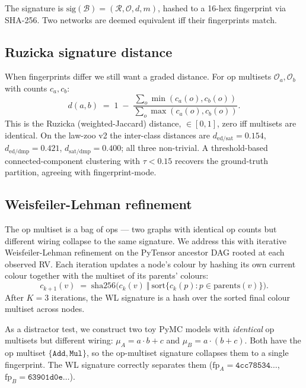 \documentclass{article}
\begin{document}
The signature is
$\mathrm{sig}(\mathcal{B}) = (\mathcal{R}, \mathcal{O}, d, m)$, hashed
to a 16-hex fingerprint via SHA-256. Two networks are deemed
equivalent iff their fingerprints match.

\subsection{Ruzicka signature distance}
\label{sec:ruzicka}

When fingerprints differ we still want a graded distance. For op
multisets $\mathcal{O}_{a}, \mathcal{O}_{b}$ with counts $c_{a}, c_{b}$:
\begin{equation}
d(a, b) \;=\; 1 \;-\; \frac{\sum_{o} \min(c_{a}(o), c_{b}(o))}
                           {\sum_{o} \max(c_{a}(o), c_{b}(o))}.
\end{equation}
This is the Ruzicka (weighted-Jaccard) distance, $\in [0, 1]$, zero iff
multisets are identical. On the law-zoo v2 the inter-class
distances are $d_{\mathrm{ed/sat}} = 0.154$,
$d_{\mathrm{ed/dmp}} = 0.421$, $d_{\mathrm{sat/dmp}} = 0.400$; all
three non-trivial. A threshold-based connected-component clustering
with $\tau < 0.15$ recovers the ground-truth partition, agreeing with
fingerprint-mode.

\subsection{Weisfeiler-Lehman refinement}
\label{sec:wl}

The op multiset is a bag of ops --- two graphs with identical op counts
but different wiring collapse to the same signature. We address this
with iterative Weisfeiler-Lehman refinement
\citep{shervashidze2011wl} on the PyTensor ancestor DAG rooted at
each observed RV. Each iteration updates a node's colour by hashing its
own current colour together with the multiset of its parents' colours:
\begin{equation}
c_{k+1}(v) \;=\; \mathrm{sha256}\bigg(c_{k}(v)\ \big\Vert\ \mathrm{sort}\{c_{k}(p): p \in \mathrm{parents}(v)\}\bigg).
\end{equation}
After $K=3$ iterations, the WL signature is a hash over the sorted
final colour multiset across nodes.

As a distractor test, we construct two toy PyMC models with
\emph{identical} op multisets but different wiring: $\mu_{A} =
a \cdot b + c$ and $\mu_{B} = a \cdot (b + c)$. Both have the op
multiset $\{\mathtt{Add}, \mathtt{Mul}\}$, so the op-multiset signature
collapses them to a single fingerprint. The WL signature correctly
separates them ($\mathrm{fp}_{A} = \mathtt{4cc78534\ldots}$,
$\mathrm{fp}_{B} = \mathtt{63901d0e\ldots}$).
\end{document}
